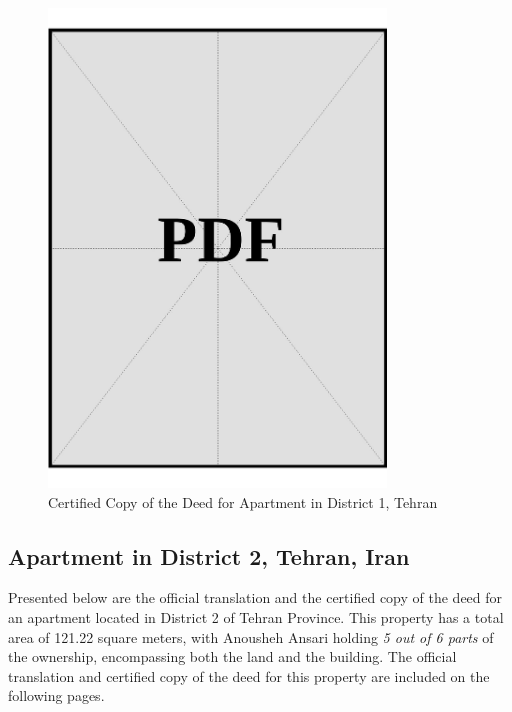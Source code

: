 \clearpage


\vspace*{\fill}
\begin{figure}[h]
    \centering
    \includegraphics[page=1, width=0.8\textwidth]{../docs/sponsor/funds/property-deeds/property-1/certified-copies.pdf}
    \caption{Certified Copy of the Deed for Apartment in District 1, Tehran}
    \label{fig:sponsor-apartment-dist1-tehran-certified-copy}
\end{figure}
\vspace*{\fill}

\clearpage

\subsection{Apartment in District 2, Tehran, Iran}\label{sec:sponsor-apartment-dist2-tehran}

Presented below are the official translation and the certified copy of the deed for an apartment located in District 2 of Tehran Province. This property has a total area of 121.22 square meters, with Anousheh Ansari holding \textit{5 out of 6 parts} of the ownership, encompassing both the land and the building. The official translation and certified copy of the deed for this property are included on the following pages.


